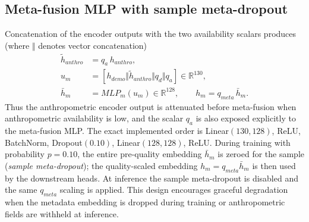 \documentclass[mathematics,article,submit,pdftex]{Definitions/mdpi}
\def\mathrm#1{#1}%
\def\mathbf#1{#1}%
\begin{document}
\subsection{Meta-fusion MLP with sample meta-dropout}
Concatenation of the encoder outputs with the two availability scalars produces (where $\Vert$ denotes vector concatenation)
\begin{equation}
\begin{aligned}
\widetilde{\mathbf{h}}_{\mathrm{anthro}} &= q_a\,\mathbf{h}_{\mathrm{anthro}},\\
\mathbf{u}_{\mathrm{m}}&=[\mathbf{h}_{\mathrm{demo}}\Vert\widetilde{\mathbf{h}}_{\mathrm{anthro}}\Vert q_d\Vert q_a]\in\mathbb{R}^{130},\\
\bar{\mathbf{h}}_{\mathrm{m}}&=\mathrm{MLP}_{\mathrm{m}}(\mathbf{u}_{\mathrm{m}})\in\mathbb{R}^{128},\qquad
\mathbf{h}_{\mathrm{m}}=q_{\mathrm{meta}}\,\bar{\mathbf{h}}_{\mathrm{m}}.
\end{aligned}
\end{equation}
Thus the anthropometric encoder output is attenuated before meta-fusion when anthropometric availability is low, and the scalar $q_a$ is also exposed explicitly to the meta-fusion MLP. The exact implemented order is Linear$(130,128)$, ReLU, BatchNorm, Dropout$(0.10)$, Linear$(128,128)$, ReLU. During training with probability $p{=}0.10$, the entire pre-quality embedding $\bar{\mathbf{h}}_{\mathrm{m}}$ is zeroed for the sample (\emph{sample meta-dropout}); the quality-scaled embedding $\mathbf{h}_{\mathrm{m}}=q_{\mathrm{meta}}\bar{\mathbf{h}}_{\mathrm{m}}$ is then used by the downstream heads. At inference the sample meta-dropout is disabled and the same $q_{\mathrm{meta}}$ scaling is applied. This design encourages graceful degradation when the metadata embedding is dropped during training or anthropometric fields are withheld at inference.
\end{document}
